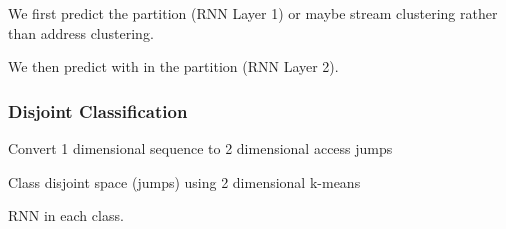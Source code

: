 We first predict the partition (RNN Layer 1) or maybe stream clustering rather than address clustering.

We then predict with in the partition (RNN Layer 2).

\subsubsection{Disjoint Classification}

Convert 1 dimensional sequence to 2 dimensional access jumps

Class disjoint space (jumps) using 2 dimensional k-means

RNN in each class.

